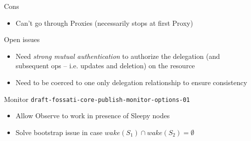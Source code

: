 \documentclass{beamer}
\begin{document}
\begin{frame}{Cons}
\begin{itemize}
 \item Can't go through Proxies (necessarily stops at first Proxy)
\end{itemize}
\end{frame}

\begin{frame}{Open issues}

\begin{itemize}
 \item Need \emph{strong mutual authentication} to authorize the delegation (and subsequent ops -- i.e. updates and deletion) on the resource
 \item Need to be coerced to one only delegation relationship to ensure consistency
\end{itemize}

\end{frame}

\begin{frame}{Monitor \hspace{5cm} {\tiny \texttt{draft-fossati-core-publish-monitor-options-01}}}

\begin{itemize}
 \item Allow Observe to work in presence of Sleepy nodes %
 \item Solve bootstrap issue in case {\scriptsize $wake(S_1) \cap wake(S_2) = \emptyset$}
\end{itemize}

\end{frame}
\end{document}
